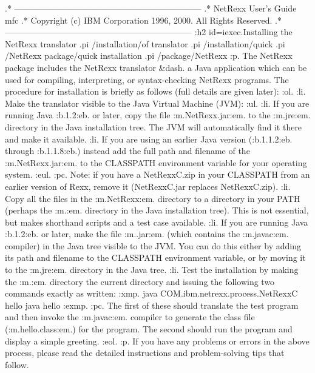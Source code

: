 .* ------------------------------------------------------------------
.* NetRexx User's Guide                                              mfc
.* Copyright (c) IBM Corporation 1996, 2000.  All Rights Reserved.
.* ------------------------------------------------------------------
:h2 id=iexec.Installing the NetRexx translator
.pi /installation/of translator
.pi /installation/quick
.pi /NetRexx package/quick installation
.pi /package/NetRexx
:p.
The NetRexx package includes the NetRexx translator &dash. a Java
application which can be used for compiling, interpreting, or
syntax-checking NetRexx programs.  The procedure for installation is
briefly as follows (full details are given later):
:ol.
:li.
Make the translator visible to the Java Virtual Machine (JVM):
:ul.
:li.
If you are running Java :b.1.2:eb. or later, copy the
file :m.NetRexx\lib\NetRexxC.jar:em. to the :m.jre\lib\ext:em. directory
in the Java installation tree.
The JVM will automatically find it there and make it available.
:li.
If you are using an earlier Java version (:b.1.1.2:eb. through
:b.1.1.8:eb.) instead add the full path and filename of
the :m.NetRexx\lib\NetRexxC.jar:em. to the CLASSPATH environment
variable for your operating system.
:eul.
:pc.
Note: if you have a NetRexxC.zip in your CLASSPATH from an earlier
version of Rexx, remove it (NetRexxC.jar replaces NetRexxC.zip).
:li.
Copy all the files in the :m.NetRexx\bin:em. directory to a directory in
your PATH (perhaps the :m.\bin:em. directory in the Java installation
tree).  This is not essential, but makes shorthand scripts and a test
case available.
:li.
If you are running Java :b.1.2:eb. or later, make the
file :m.\lib\tools.jar:em. (which contains the :m.javac:em. compiler) in
the Java tree visible to the JVM.  You can do this either by adding its
path and filename to the CLASSPATH environment variable, or by moving it
to the :m.jre\lib\ext:em. directory in the Java tree.
:li.
Test the installation by making the :m.\bin:em. directory the current
directory and issuing the following two commands exactly as written:
:xmp.
java COM.ibm.netrexx.process.NetRexxC hello
java hello
:exmp.
:pc.
The first of these should translate the test program and then invoke
the :m.javac:em. compiler to generate the class file
(:m.hello.class:em.) for the program.  The second should run the program
and display a simple greeting.
:eol.
:p.
If you have any problems or errors in the above process, please read the
detailed instructions and problem-solving tips that follow.
